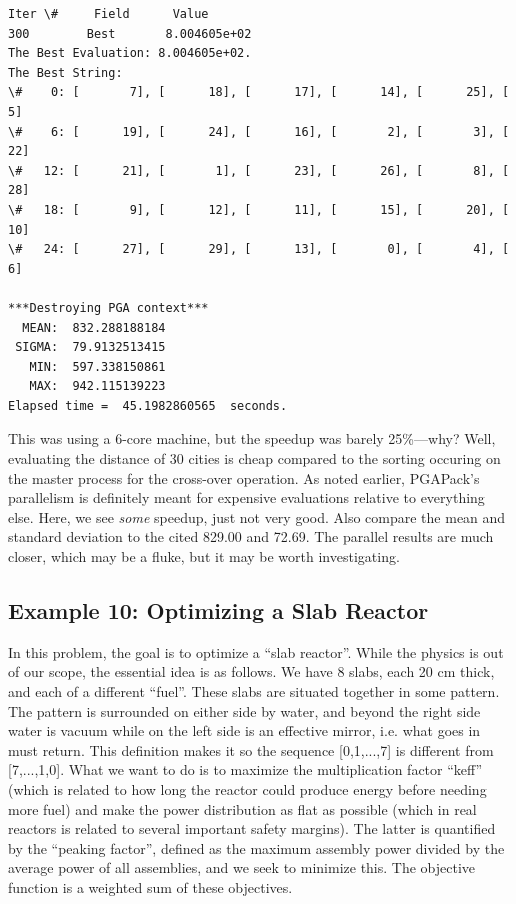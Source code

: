 \documentclass[letterpaper,11pt,english]{sphinxmanual}
\begin{document}
\begin{Verbatim}[commandchars=\\\{\}]
Iter \#     Field      Value
300        Best       8.004605e+02
The Best Evaluation: 8.004605e+02.
The Best String:
\#    0: [       7], [      18], [      17], [      14], [      25], [       5]
\#    6: [      19], [      24], [      16], [       2], [       3], [      22]
\#   12: [      21], [       1], [      23], [      26], [       8], [      28]
\#   18: [       9], [      12], [      11], [      15], [      20], [      10]
\#   24: [      27], [      29], [      13], [       0], [       4], [       6]

***Destroying PGA context***
  MEAN:  832.288188184
 SIGMA:  79.9132513415
   MIN:  597.338150861
   MAX:  942.115139223
Elapsed time =  45.1982860565  seconds.
\end{Verbatim}

This was using a 6-core machine, but the speedup was barely
25\%---why?  Well, evaluating the distance of 30 cities is
cheap compared to the sorting occuring on the master process
for the cross-over operation.  As noted earlier, PGAPack's
parallelism is definitely meant for expensive evaluations
relative to everything else.  Here, we see \emph{some} speedup,
just not very good.  Also compare the mean and standard
deviation to the cited 829.00 and 72.69.  The parallel results
are much closer, which may be a fluke, but it may be worth
investigating.


\subsection{Example 10: Optimizing a Slab Reactor}
\label{examples:example-10-optimizing-a-slab-reactor}
In this problem, the goal is to optimize a ``slab reactor''.  While
the physics is out of our scope, the essential idea is as
follows.  We have 8 slabs, each 20 cm thick, and each of a
different ``fuel''.  These slabs are situated together in some
pattern.  The pattern is surrounded on either side by water,
and beyond the right side water is vacuum while on the left
side is an effective mirror, i.e. what goes in must return.
This definition makes it so the sequence {[}0,1,...,7{]} is
different from {[}7,...,1,0{]}.  What we want to do is to maximize
the multiplication factor ``keff'' (which is related to how long
the reactor could produce energy before needing more fuel)
and make the power distribution as flat as possible (which
in real reactors is related to several important safety
margins).  The latter is quantified by the ``peaking factor'',
defined as the maximum assembly power divided by the average
power of all assemblies, and we seek to minimize this.  The
objective function is a weighted sum of these objectives.
\end{document}
